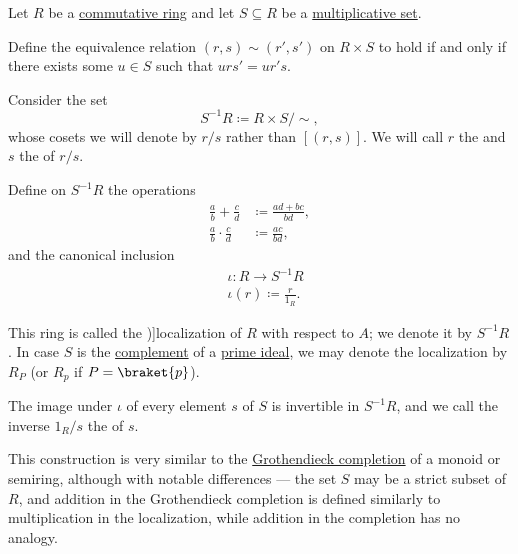 \begin{definition}\label{def:ring_localization}
  Let \( R \) be a \hyperref[def:ring/commutative]{commutative ring} and let \( S \subseteq R \) be a \hyperref[def:multiplicative_set_in_ring]{multiplicative set}.

  Define the equivalence relation \( (r, s) \sim (r', s') \) on \( R \times S \) to hold if and only if there exists some \( u \in S \) such that \( u r s' = u r' s \).

  Consider the set
  \begin{equation*}
    S^{-1} R \coloneqq R \times S / {\sim},
  \end{equation*}
  whose cosets we will denote by \( r / s \) rather than \( [(r, s)] \). We will call \( r \) the  and \( s \) the  of \( r / s \).

  Define on \( S^{-1} R \) the operations
  \begin{align*}
    \frac a b + \frac c d     &\coloneqq \frac {a d + b c} {b d}, \\
    \frac a b \cdot \frac c d &\coloneqq \frac {a c} {b d},
  \end{align*}
  and the canonical inclusion
  \begin{equation*}
    \begin{aligned}
      &\iota: R \to S^{-1} R \\
      &\iota(r) \coloneqq \frac r {1_R}.
    \end{aligned}
  \end{equation*}

  This ring is called the \term[bg=локализация (\cite[23]{КоцевСидеров2016})]{localization} of \( R \) with respect to \( A \); we denote it by \( S^{-1} R \). In case \( S \) is the \hyperref[thm:boolean_algebra_of_subsets/complement]{complement} of a \hyperref[def:semiring_ideal/prime]{prime ideal}, we may denote the localization by \( R_P \) (or \( R_p \) if \( P = \braket{ p } \)).

  The image under \( \iota \) of every element \( s \) of \( S \) is invertible in \( S^{-1} R \), and we call the inverse \( 1_R / s \) the  of \( s \).
\end{definition}
\begin{comments}
  \item This construction is very similar to the \hyperref[def:monoid_grothendieck_completion]{Grothendieck completion} of a monoid or semiring, although with notable differences --- the set \( S \) may be a strict subset of \( R \), and addition in the Grothendieck completion is defined similarly to multiplication in the localization, while addition in the completion has no analogy.
\end{comments}
